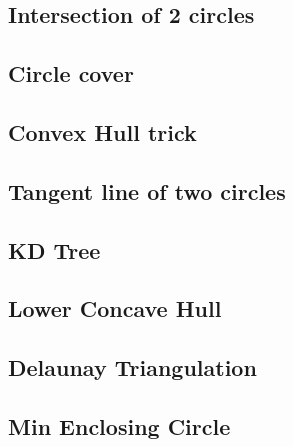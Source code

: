 \documentclass[a4paper,10pt,twocolumn,oneside]{article}
\begin{document}
\subsection{Intersection of 2 circles}
\subsection{Circle cover}


\subsection{Convex Hull trick}


\subsection{Tangent line of two circles}


\subsection{KD Tree}
%


%

\subsection{Lower Concave Hull}


\subsection{Delaunay Triangulation}


\subsection{Min Enclosing Circle}


%
\end{document}
